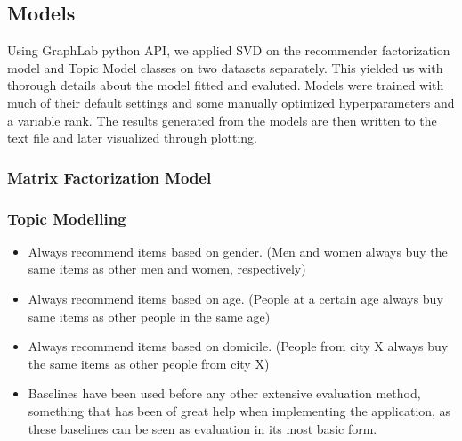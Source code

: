 \subsection{Models}
Using GraphLab python API, we applied SVD on the recommender factorization model and Topic Model classes on two datasets separately. This yielded us with thorough details about the model fitted and evaluted. Models were trained with much of their default settings and some manually optimized hyperparameters and a variable rank. The results generated from the models are then written to the text file and later visualized through plotting.

\subsubsection{Matrix Factorization Model}

\subsubsection{Topic Modelling}









\begin{itemize}
\item Always recommend items based on gender. (Men and women always buy the same items as other men and women, respectively)
\item Always recommend items based on age. (People at a certain age always buy same items as other people in the same age)
\item Always recommend items based on domicile. (People from city X always buy the same items as other people from city X)
\item Baselines have been used before any other extensive evaluation method, something that has been of great help when implementing the application, as these baselines can be seen as evaluation in its most basic form.

\end{itemize}

